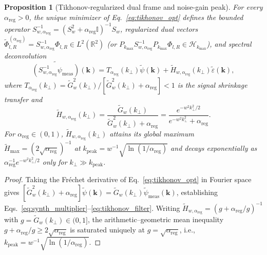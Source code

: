 \documentclass[aps,pra,onecolumn,notitlepage,11pt,tightenlines,amsmath,amssymb,floatfix,longbibliography]{revtex4-2}
\newtheorem{proposition}{Proposition}
\begin{document}
\begin{proposition}[Tikhonov-regularized dual frame and noise-gain peak]
\label{prop:tikhonov_dual}
For every $\alpha_{\mathrm{reg}} > 0$, the unique minimizer of Eq.~\eqref{eq:tikhonov_opt} defines the bounded operator $S_{w,\alpha_{\mathrm{reg}}}^{-1} = (S_w^2 + \alpha_{\mathrm{reg}}\mathbb{I})^{-1}S_w$, regularized dual vectors $\widetilde{\Phi}_{l,R}^{(\alpha_{\mathrm{reg}})} = S_{w,\alpha_{\mathrm{reg}}}^{-1}\Phi_{l,R} \in L^2(\mathbb{R}^2)$ (or $P_{k_{\max}}S_{w,\alpha_{\mathrm{reg}}}^{-1}P_{k_{\max}}\Phi_{l,R} \in \mathcal{H}_{k_{\max}}$), and spectral deconvolution
\begin{equation}
\widetilde{(S_{w,\alpha_{\mathrm{reg}}}^{-1}\psi_{\mathrm{meas}})}(\mathbf{k}) = T_{\alpha_{\mathrm{reg}}}(k_\perp)\widetilde{\psi}(\mathbf{k}) + \widetilde{H}_{w,\alpha_{\mathrm{reg}}}(k_\perp)\widetilde{\varepsilon}(\mathbf{k}),
\label{eq:synth_multiplier}
\end{equation}
where $T_{\alpha_{\mathrm{reg}}}(k_\perp) = \widetilde{G}_w^2(k_\perp)/[\widetilde{G}_w^2(k_\perp) + \alpha_{\mathrm{reg}}] < 1$ is the signal shrinkage transfer and
\begin{equation}
\widetilde{H}_{w,\alpha_{\mathrm{reg}}}(k_\perp) = \frac{\widetilde{G}_w(k_\perp)}{\widetilde{G}_w^2(k_\perp) + \alpha_{\mathrm{reg}}} = \frac{e^{-w^2 k_\perp^2/2}}{e^{-w^2 k_\perp^2} + \alpha_{\mathrm{reg}}}.
\label{eq:tikhonov_filter}
\end{equation}
For $\alpha_{\mathrm{reg}} \in (0,1)$, $\widetilde{H}_{w,\alpha_{\mathrm{reg}}}(k_\perp)$ attains its global maximum $\widetilde{H}_{\max} = (2\sqrt{\alpha_{\mathrm{reg}}})^{-1}$ at $k_{\mathrm{peak}} = w^{-1}\sqrt{\ln(1/\alpha_{\mathrm{reg}})}$ and decays exponentially as $\alpha_{\mathrm{reg}}^{-1}e^{-w^2 k_\perp^2/2}$ only for $k_\perp \gg k_{\mathrm{peak}}$.
\end{proposition}
\begin{proof}
Taking the Fr\'echet derivative of Eq.~\eqref{eq:tikhonov_opt} in Fourier space gives $[\widetilde{G}_w^2(k_\perp) + \alpha_{\mathrm{reg}}]\widetilde{\psi}(\mathbf{k}) = \widetilde{G}_w(k_\perp)\widetilde{\psi}_{\mathrm{meas}}(\mathbf{k})$, establishing Eqs.~\eqref{eq:synth_multiplier}--\eqref{eq:tikhonov_filter}. Writing $\widetilde{H}_{w,\alpha_{\mathrm{reg}}} = (g + \alpha_{\mathrm{reg}}/g)^{-1}$ with $g = \widetilde{G}_w(k_\perp) \in (0,1]$, the arithmetic--geometric mean inequality $g + \alpha_{\mathrm{reg}}/g \ge 2\sqrt{\alpha_{\mathrm{reg}}}$ is saturated uniquely at $g = \sqrt{\alpha_{\mathrm{reg}}}$, i.e., $k_{\mathrm{peak}} = w^{-1}\sqrt{\ln(1/\alpha_{\mathrm{reg}})}$.
\end{proof}
\end{document}
